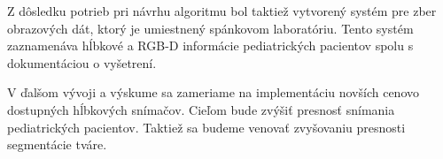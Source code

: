Z dôsledku potrieb pri návrhu algoritmu bol taktiež vytvorený systém pre zber obrazových dát, ktorý je umiestnený spánkovom laboratóriu. Tento systém zaznamenáva hĺbkové a RGB-D informácie pediatrických pacientov spolu s dokumentáciou o vyšetrení. 

V ďalšom vývoji a výskume sa zameriame na implementáciu novších cenovo dostupných hĺbkových snímačov. Cieľom bude zvýšiť presnosť snímania pediatrických pacientov. Taktiež sa budeme venovať zvyšovaniu presnosti segmentácie tváre. 
